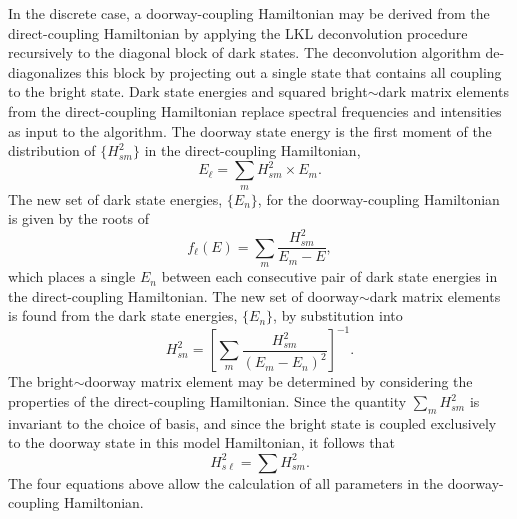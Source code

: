 In the discrete case, a doorway-coupling Hamiltonian may be derived
from the direct-coupling Hamiltonian by applying the LKL deconvolution
procedure recursively to the diagonal block of dark states.  The
deconvolution algorithm de-diagonalizes this block by projecting out a
single state that contains all coupling to the bright state.  Dark
state energies and squared bright$\sim$dark matrix elements from the
direct-coupling Hamiltonian replace spectral frequencies and
intensities as input to the algorithm.  The doorway state energy is
the first moment of the distribution of $\lbrace H_{sm}^2 \rbrace$ in
the direct-coupling Hamiltonian,
\begin{equation}
  \label{eq:dse-discrete}
  E_{\ell} = \sum_m H_{sm}^2 \times E_m.
\end{equation}
The new set of dark state energies, $\lbrace E_n \rbrace$, for the
doorway-coupling Hamiltonian is given by the roots of
\begin{equation}
  f_{\ell}(E) = \sum_m \frac{H_{sm}^2}{E_m - E},
\end{equation}
which places a single $E_n$ between each consecutive pair of dark
state energies in the direct-coupling Hamiltonian.  The new set of
doorway$\sim$dark matrix elements is found from the dark state
energies, $\lbrace E_n \rbrace$, by substitution into
\begin{equation}
  H_{sn}^2 = 
  \left [
    \sum_m \frac{H_{sm}^2}{(E_m - E_n)^2}
  \right ]^{-1}.
\end{equation}
The bright$\sim$doorway matrix element may be determined by
considering the properties of the direct-coupling Hamiltonian.  Since
the quantity $\sum_m H_{sm}^2$ is invariant to the choice of basis,
and since the bright state is coupled exclusively to the doorway state
in this model Hamiltonian, it follows that
\begin{equation}
  \label{eq:doorway-me}
  H_{s\ell}^2 = \sum H_{sm}^2.
\end{equation}
The four equations above allow the calculation of all parameters in
the doorway-coupling Hamiltonian.

